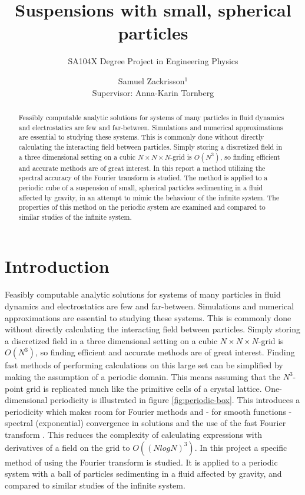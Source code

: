 \documentclass[a4paper,
twoside=false,abstract=false,numbers=noenddot,
titlepage=false,headings=small,parskip=half,version=last]{scrartcl}
\title{\vspace{15pt}Suspensions with small, spherical particles}
\subtitle{SA104X Degree Project in Engineering Physics}
\author[2]{Samuel Zackrisson$^1$ \\ \footnotesize Supervisor: Anna-Karin Tornberg}
\affil[2]{Numerical Analysis, Royal Institute of Technology (KTH)}
\affil[1]{samuelz@kth.se}
\affil[2]{akto@kth.se}
\begin{document}
\maketitle
\thispagestyle{fancy}

\begin{abstract}
Feasibly computable analytic solutions for systems of many particles in fluid dynamics and electrostatics are few and far-between.
Simulations and numerical approximations are essential to studying these systems.
This is commonly done without directly calculating the interacting field between particles.
Simply storing a discretized field in a three dimensional setting on a cubic $N\times N\times N$-grid is $O(N^3)$, so finding efficient and accurate methods are of great interest.
In this report a method utilizing the spectral accuracy of the Fourier transform is studied.
The method is applied to a periodic cube of a suspension of small, spherical particles sedimenting in a fluid affected by gravity, in an attempt to mimic the behaviour of the infinite system.
The properties of this method on the periodic system are examined and compared to similar studies of the infinite system.
\end{abstract}

\pagebreak
\thispagestyle{empty}

\tableofcontents

\pagebreak

\section{Introduction}
Feasibly computable analytic solutions for systems of many particles in fluid dynamics and electrostatics are few and far-between.
Simulations and numerical approximations are essential to studying these systems.
This is commonly done without directly calculating the interacting field between particles.
Simply storing a discretized field in a three dimensional setting on a cubic $N\times N\times N$-grid is $O(N^3)$, so finding efficient and accurate methods are of great interest.
Finding fast methods of performing calculations on this large set can be simplified by making the assumption of a periodic domain.
This means assuming that the $N^3$-point grid is replicated much like the primitive cells of a crystal lattice.
One-dimensional periodicity is illustrated in figure \ref{fig:periodic-box}.
This introduces a periodicity which makes room for Fourier methods and - for smooth functions - spectral (exponential) convergence in solutions and the use of the fast Fourier transform \cite{fluctuatesediment}. This reduces the complexity of calculating expressions with derivatives of a field on the grid to $O\left((NlogN)^3\right)$. In this project a specific method of using the Fourier transform is studied.
It is applied to a periodic system with a ball of particles sedimenting in a fluid affected by gravity, and compared to similar studies of the infinite system.
\end{document}
